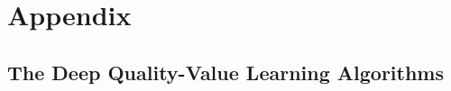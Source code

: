 
\chapter*{Appendix}
\label{ch:appendix}


\section{The Deep Quality-Value Learning Algorithms}




